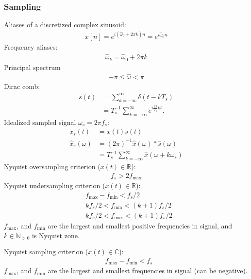 \documentclass[6pt,landscape,a4paper]{article}
\begin{document}
\begin{multicols*}{5}
\subsubsection*{Sampling}
Aliases of a discretized complex sinusoid:
\begin{align*}
 x[n]  = e^{i(\hat{\omega}_0 + 2\pi k) n} = e^{i\hat{\omega}_0 n} 
\end{align*}
Frequency aliases:
\begin{align*}
    \hat{\omega}_k = \hat{\omega}_0 + 2\pi k
\end{align*}
Principal spectrum
\begin{align*}
 -\pi \le \hat{\omega} < \pi 
 \end{align*}
 Dirac comb:
 \begin{align*}
 s(t) &= \textstyle\sum_{k=-\infty}^{\infty}\delta(t-kT_s)  \\
  &= T_s^{-1}\textstyle\sum_{k=-\infty}^{\infty} e^{i \frac{2\pi}{T_s}kt}.
 \end{align*}
 Idealized sampled signal $\omega_s = 2\pi f_s$:
 \begin{align*}
 x_s(t) &= x(t) s(t) \\
\hat{x}_s(\omega)  &= (2\pi)^{-1} \hat{x}(\omega) * \hat{s}(\omega)\\
&= T_s^{-1} \textstyle\sum_{k=-\infty}^{\infty}\hat{x}(\omega + k \omega_s)
 \end{align*}
Nyquist oversampling criterion ($x(t)\in \mathbb{R}$):
\begin{align*}
f_s > 2 f_{\mathrm{max}}
 \end{align*}
Nyquist undersampling criterion ($x(t)\in \mathbb{R}$):
\begin{align*}
&f_{\mathrm{max}}-f_{\mathrm{min}} < f_s/2 \\ 
&k f_s/2 < f_{\mathrm{min}} < (k+1) f_s/2 \\ 
&k f_s/2 < f_{\mathrm{max}} < (k+1) f_s/2 
 \end{align*}
$f_{\mathrm{max}}$, and $f_{\mathrm{min}}$ are the largest and smallest positive frequencies in signal, and $k \in \mathbb{N}_{>0}$ is Nyquist zone.

Nyquist sampling criterion ($x(t)\in \mathbb{C}$):
\begin{align*}
&f_{\mathrm{max}}-f_{\mathrm{min}} < f_s 
 \end{align*}
$f_{\mathrm{max}}$, and $f_{\mathrm{min}}$ are the largest and smallest frequencies in signal (can be negative).

\end{multicols*}
\end{document}
